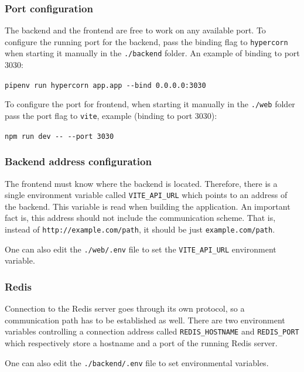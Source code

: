 \documentclass[a4paper, 11pt, twoside]{report}
\theoremstyle{definition}
\begin{document}
\subsubsection{Port configuration}

The backend and the frontend are free to work on any available port. To configure the running port for the backend, pass the binding flag to \verb|hypercorn| when starting it manually in the \verb|./backend| folder. An example of binding to port 3030:

\verb|pipenv run hypercorn app.app --bind 0.0.0.0:3030| \par

To configure the port for frontend, when starting it manually in the \verb|./web| folder pass the port flag to \verb|vite|, example (binding to port 3030):

\verb|npm run dev -- --port 3030| \par

\subsubsection{Backend address configuration}

The frontend must know where the backend is located. Therefore, there is a single environment variable called \verb|VITE_API_URL| which points to an address of the backend. This variable is read when building the application. An important fact is, this address should not include the communication scheme. That is, instead of \verb|http://example.com/path|, it should be just \verb|example.com/path|. \par
One can also edit the \verb|./web/.env| file to set the \verb|VITE_API_URL| environment variable. \par

\subsubsection{Redis}

Connection to the Redis server goes through its own protocol, so a communication path has to be established as well. There are two environment variables controlling a connection address called \verb|REDIS_HOSTNAME| and \verb|REDIS_PORT| which respectively store a hostname and a port of the running Redis server. \par
One can also edit the \verb|./backend/.env| file to set environmental variables. \par
\end{document}
